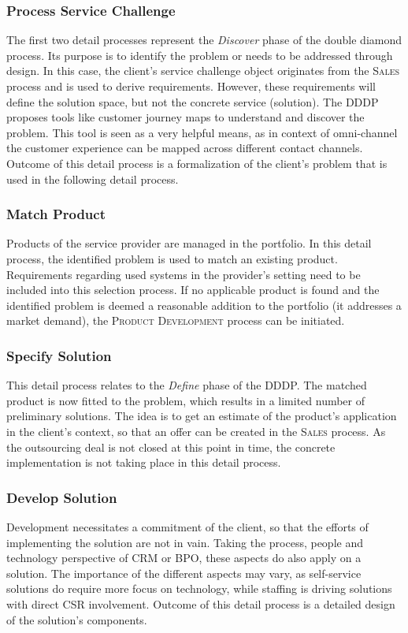 	\subsubsection{Process Service Challenge}
	The first two detail processes represent the \textit{Discover} phase of the double diamond process. Its purpose is to identify the problem or needs to be addressed through design. In this case, the client's service challenge object originates from the \textsc{Sales} process and is used to derive requirements. However, these requirements will define the solution space, but not the concrete service (solution). The \acrshort{DDDP} proposes tools like customer journey maps to understand and discover the problem. This tool is seen as a very helpful means, as in context of omni-channel the customer experience can be mapped across different contact channels. Outcome of this detail process is a formalization of the client's problem that is used in the following detail process. 
	
	\subsubsection{Match Product}
	Products of the service provider are managed in the portfolio. In this detail process, the identified problem is used to match an existing product. Requirements regarding used systems in the provider's setting need to be included into this selection process. If no applicable product is found and the identified problem is deemed a reasonable addition to the portfolio (\ie it addresses a market demand), the \textsc{Product Development} process can be initiated. 
	
	\subsubsection{Specify Solution}
	This detail process relates to the \textit{Define} phase of the \acrshort{DDDP}. The matched product is now fitted to the problem, which results in a limited number of preliminary solutions. The idea is to get an estimate of the product's application in the client's context, so that an offer can be created in the \textsc{Sales} process. As the outsourcing deal is not closed at this point in time, the concrete implementation is not taking place in this detail process. 
	
	\subsubsection{Develop Solution}
	Development necessitates a commitment of the client, so that the efforts of implementing the solution are not in vain. Taking the process, people and technology perspective of \acrshort{CRM} or \acrshort{BPO}, these aspects do also apply on a solution. The importance of the different aspects may vary, as self-service solutions do require more focus on technology, while staffing is driving solutions with direct \acrshort{CSR} involvement. Outcome of this detail process is a detailed design of the solution's components. 
	
